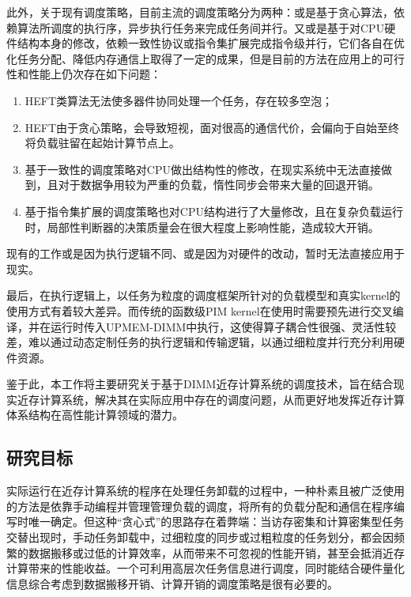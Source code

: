     此外，关于现有调度策略，目前主流的调度策略分为两种：或是基于贪心算法，依赖算法所调度的执行序，异步执行任务来完成任务间并行。又或是基于对CPU硬件结构本身的修改，依赖一致性协议或指令集扩展完成指令级并行，它们各自在优化任务分配、降低内存通信上取得了一定的成果，但是目前的方法在应用上的可行性和性能上仍次存在如下问题：
    \begin{enumerate}
        \item HEFT类算法无法使多器件协同处理一个任务，存在较多空泡；
        \item HEFT由于贪心策略，会导致短视，面对很高的通信代价，会偏向于自始至终将负载驻留在起始计算节点上。
        \item 基于一致性的调度策略对CPU做出结构性的修改，在现实系统中无法直接做到，且对于数据争用较为严重的负载，惰性同步会带来大量的回退开销。
        \item 基于指令集扩展的调度策略也对CPU结构进行了大量修改，且在复杂负载运行时，局部性判断器的决策质量会在很大程度上影响性能，造成较大开销。
    \end{enumerate}
    
    现有的工作或是因为执行逻辑不同、或是因为对硬件的改动，暂时无法直接应用于现实。
    
    最后，在执行逻辑上，以任务为粒度的调度框架所针对的负载模型和真实kernel的使用方式有着较大差异。而传统的函数级PIM kernel在使用时需要预先进行交叉编译，并在运行时传入UPMEM-DIMM中执行，这使得算子耦合性很强、灵活性较差，难以通过动态定制任务的执行逻辑和传输逻辑，以通过细粒度并行充分利用硬件资源。

    鉴于此，本工作将主要研究关于基于DIMM近存计算系统的调度技术，旨在结合现实近存计算系统，解决其在实际应用中存在的调度问题，从而更好地发挥近存计算体系结构在高性能计算领域的潜力。

    \subsection{研究目标}\label{subsec:research_goals}
    实际运行在近存计算系统的程序在处理任务卸载的过程中，一种朴素且被广泛使用的方法是依靠手动编程并管理管理负载的调度，将所有的负载分配和通信在程序编写时唯一确定。但这种“贪心式”的思路存在着弊端：当访存密集和计算密集型任务交替出现时，手动任务卸载中，过细粒度的同步或过粗粒度的任务划分，都会因频繁的数据搬移或过低的计算效率，从而带来不可忽视的性能开销，甚至会抵消近存计算带来的性能收益\citep{gomez-luna_benchmarking_2021,diab_high-throughput_2022}。一个可利用高层次任务信息进行调度，同时能结合硬件量化信息综合考虑到数据搬移开销、计算开销的调度策略是很有必要的。
    
